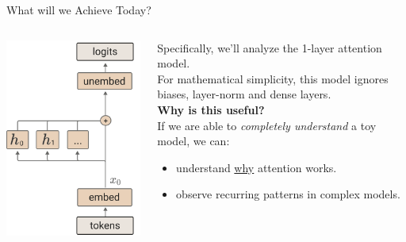 \documentclass{beamer}
\begin{document}
\begin{frame}{What will we Achieve Today?}
	\begin{columns}
		\begin{column}{.35\textwidth}
			\begin{center}
				\includegraphics[width=\textwidth]{img/circuit-arch.png}
			\end{center}
		\end{column}
		\begin{column}{.5\textwidth}
			Specifically, we'll analyze the 1-layer attention model. \newline \\

			For mathematical simplicity, this model ignores biases, layer-norm and dense layers. \pause \newline \\

			\textbf{Why is this useful?} \pause \\
			If we are able to \textit{completely understand} a toy model, we can:
			\begin{itemize}[label=-]
				\item understand \underline{why} attention works. \pause
				\item observe recurring patterns in complex models.
			\end{itemize}
		\end{column}
	\end{columns}
\end{frame}
\end{document}
